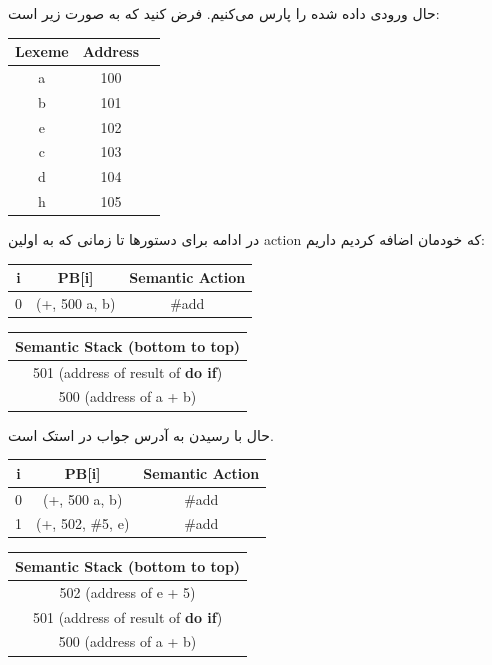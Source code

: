 \documentclass[]{article}
\begin{document}
حال ورودی داده شده را پارس می‌کنیم. فرض کنید که
به صورت زیر است:
\begin{latin}
\centering
\begin{tabular}{|c|c|c|}
    \hline
    Lexeme & Address\\
    \hline
    a & 100\\
    b & 101\\
    e & 102\\
    c & 103\\
    d & 104\\
    h & 105\\
    \hline
\end{tabular}
\end{latin}
در ادامه برای دستور‌ها تا زمانی که به اولین
action
که خودمان اضافه کردیم داریم:
\begin{latin}
\centering
\begin{tabular}{|c|c|c|}
    \hline
    i & PB[i] & Semantic Action\\
    \hline
    0 & (+, 500 a, b) & \#add\\
    \hline
\end{tabular}
\begin{tabular}{|c|}
    \hline
    Semantic Stack (bottom to top)\\
    \hline
    501 (address of result of \textbf{do if})\\
    \hline
    500 (address of a + b)\\
    \hline
\end{tabular}
\end{latin}
حال با رسیدن به
آدرس جواب
در استک است.
\begin{latin}
\centering
\begin{tabular}{|c|c|c|}
    \hline
    i & PB[i] & Semantic Action\\
    \hline
    0 & (+, 500 a, b) & \#add\\
    1 & (+, 502, \#5, e) & \#add\\
    \hline
\end{tabular}
\begin{tabular}{|c|}
    \hline
    Semantic Stack (bottom to top)\\
    \hline
    502 (address of e + 5)\\
    \hline
    501 (address of result of \textbf{do if})\\
    \hline
    500 (address of a + b)\\
    \hline
\end{tabular}
\end{latin}
\end{document}
